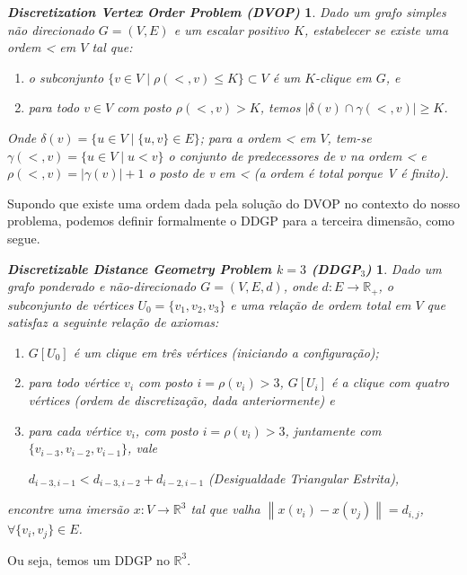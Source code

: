 \documentclass[11pt]{article}
\newtheorem*{DDGP}{{\emph{Discretizable Distance Geometry Problem $k =3$ (DDGP$_3$)}}}
\newtheorem*{DVOP}{{\emph{Discretization Vertex Order Problem (DVOP)}}}
\begin{document}
{\begin{DVOP}
	Dado um grafo simples não direcionado $G = (V, E)$ e um escalar positivo $K$, estabelecer se existe uma ordem < em $V$ tal que: 
	\begin{enumerate}
		\item[(a)] o subconjunto $\{v \in V \mid \rho(<,v) \leq K\} \subset V$ é um $K$-clique em $G$, e
		\item[(b)] para todo $v \in V$ com posto $\rho(<,v) > K$, temos $|\delta(v) \cap \gamma(<,v)| \geq K$.
	\end{enumerate}
Onde $\delta(v) = \{u \in V \mid  \{u,v\} \in E\}$; para a ordem < em $V$, tem-se $\gamma(<,v) = \{u \in V \mid u < v\}$ o conjunto de predecessores de $v$ na ordem < e $\rho(<,v) = |\gamma(v)| + 1$ o posto de v em < (a ordem é total porque V é finito).
\end{DVOP}

Supondo que existe uma ordem dada pela solução do DVOP no contexto do nosso problema, podemos definir formalmente o DDGP para a terceira dimensão, como segue.

\begin{DDGP} \label{def:DDGP}
	Dado um grafo ponderado e não-direcionado $G = (V,E,d)$, onde $d: E \longrightarrow \mathbb{R}_{+}$, o subconjunto de vértices $U_{0} = \{v_{1},v_{2},v_{3} \}$ e uma relação de ordem total em $V$ que satisfaz a seguinte relação de axiomas:
	\begin{enumerate}[(1)]
		\item $G[U_{0}]$ é um clique em três vértices (iniciando a configuração);
		\item para todo vértice $v_{i}$ com posto $i = \rho(v_{i}) > 3$, $G[U_{i}]$ é a clique com quatro vértices (ordem de discretização, dada anteriormente) e
		\item para cada vértice $v_{i}$, com posto $i = \rho(v_{i}) > 3$, juntamente com $\{ v_{i-3}, v_{i-2} , v_{i-1} \}$, vale
		\begin{center}
			$d_{i-3,i-1} < d_{i-3,i-2} + d_{i-2,i-1}$ \hspace{0.5cm} (Desigualdade Triangular Estrita),
		\end{center}
	\end{enumerate}
	encontre uma imersão $x: V \longrightarrow \mathbb{R}^{3}$ tal que valha $\left\| x(v_{i}) - x(v_{j}) \right\| = d_{i,j}$, $\forall \{v_{i},v_{j} \} \in E$.
\end{DDGP}

Ou seja, temos um DDGP no $\mathbb{R}^3$.

}
\end{document}
